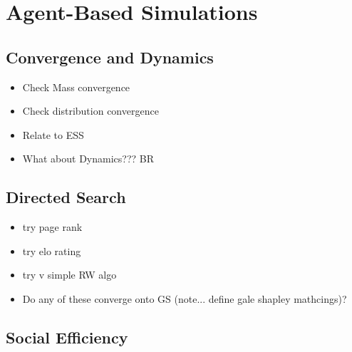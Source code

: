 \section{Agent-Based Simulations}
\label{sec: Chapter 4}  
\subsection{Convergence and Dynamics}
\begin{itemize}
    \item Check Mass convergence
    \item Check distribution convergence
    \item Relate to ESS
    \item What about Dynamics??? BR
\end{itemize}
\subsection{Directed Search}
\label{sec: sub chapter in chapter 4}
\begin{itemize}
    \item try page rank
    \item try elo rating
    \item try v simple RW algo
    \item Do any of these converge onto GS (note... define gale shapley mathcings)?
\end{itemize}
\subsection{Social Efficiency}


